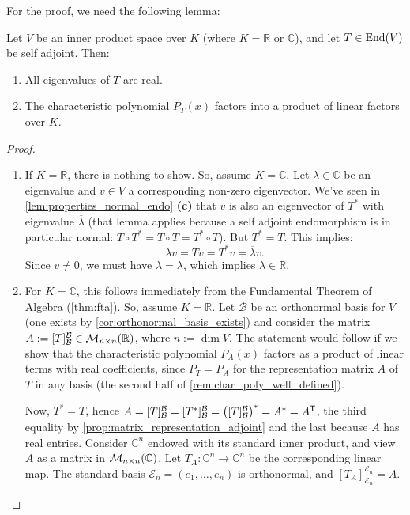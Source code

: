 For the proof, we need the following lemma:

\begin{lemma}
\label{lem:self_adj_properties}
Let $V$ be an inner product space over $K$ (where $K = \mathbb{R}$ or $\mathbb{C}$), and let $T \in \operatorname{End}(V)$ be self adjoint. Then:
\begin{enumerate}[label=\textbf{(\alph*)}]
    \item All eigenvalues of $T$ are real.
    \item The characteristic polynomial $P_T(x)$ factors into a product of linear factors over $K$.
\end{enumerate}
\end{lemma}

\begin{proof}
\begin{enumerate}[label=\textbf{(\alph*)}]
    \item If $K = \mathbb{R}$, there is nothing to show. So, assume $K = \mathbb{C}$. Let $\lambda \in \mathbb{C}$ be an eigenvalue and $v \in V$ a corresponding non-zero eigenvector. We've seen in \cref{lem:properties_normal_endo} \textbf{(c)} that $v$ is also an eigenvector of $T^*$ with eigenvalue $\overline{\lambda}$ (that lemma applies because a self adjoint endomorphism is in particular normal: $T \circ T^* = T \circ T = T^* \circ T$). But $T^* = T$. This implies:
    \[
        \lambda v = Tv = T^*v = \overline{\lambda} v.
    \]
    Since $v \neq 0$, we must have $\lambda = \overline{\lambda}$, which implies $\lambda \in \mathbb{R}$.
    
    \item For $K = \mathbb{C}$, this follows immediately from the Fundamental Theorem of Algebra (\cref{thm:fta}). So, assume $K = \mathbb{R}$. Let $\mathcal{B}$ be an orthonormal basis for $V$ (one exists by \cref{cor:orthonormal_basis_exists}) and consider the matrix $A := [T]_{\mathcal{B}}^{\mathcal{B}} \in \mathcal{M}_{n \times n}(\mathbb{R})$, where $n := \dim V$. The statement would follow if we show that the characteristic polynomial $P_A(x)$ factors as a product of linear terms with real coefficients, since $P_T = P_A$ for the representation matrix $A$ of $T$ in any basis (the second half of \cref{rem:char_poly_well_defined}).
    
    Now, $T^* = T$, hence $A = [T]_{\mathcal{B}}^{\mathcal{B}} = [T^*]_{\mathcal{B}}^{\mathcal{B}} = \left([T]_{\mathcal{B}}^{\mathcal{B}}\right)^* = A^* = A^{\mathsf{T}}$, the third equality by \cref{prop:matrix_representation_adjoint} and the last because $A$ has real entries.
    Consider $\mathbb{C}^n$ endowed with its standard inner product, and view $A$ as a matrix in $\mathcal{M}_{n \times n}(\mathbb{C})$. Let $T_A \colon \mathbb{C}^n \to \mathbb{C}^n$ be the corresponding linear map. The standard basis $\mathcal{E}_n = (e_1, \dots, e_n)$ is orthonormal, and $[T_A]_{\mathcal{E}_n}^{\mathcal{E}_n} = A$. 
    

\end{enumerate}
\end{proof}
